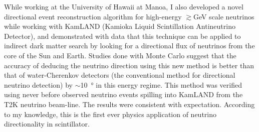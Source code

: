 \documentclass[11pt]{article} %
\begin{document}
While working at the University of Hawaii at Manoa, I also developed a novel
directional event reconstruction algorithm for high-energy
$\gtrsim$\si{\giga\electronvolt} scale neutrinos while working with KamLAND
(Kamioka Liquid Scintillation Antineutrino Detector), and demonstrated with
data that this technique can be applied to indirect dark matter search by
looking for a directional flux of neutrinos from the core of the Sun and Earth.
Studies done with Monte Carlo suggest that the accuracy of deducing the
neutrino direction using this new method is better than that of water-Cherenkov
detectors (the conventional method for directional neutrino detection) by
$\sim$\SI{10}{\degree} in this energy regime. This method was verified using
never before observed neutrino events spilling into KamLAND from the T2K
neutrino beam-line. The results were consistent with expectation. According to
my knowledge, this is the first ever physics application of neutrino
directionality in scintillator.


\end{document}
